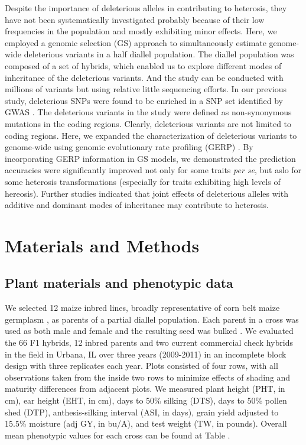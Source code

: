 \documentclass[9pt,twocolumn,twoside]{gsajnl}
\begin{document}
\DIFaddbegin 


\DIFaddend Despite the importance of deleterious alleles in contributing to heterosis, they have not been systematically investigated probably because of their low frequencies in the population and mostly exhibiting minor effects. Here, we employed a genomic selection (GS) approach to simultaneously estimate genome-wide deleterious variants in a half diallel population. The diallel population was composed of a set of hybrids, which enabled us to explore different modes of inheritance of the deleterious variants. And the study can be conducted with millions of variants but using relative little sequencing efforts. In our previous study, deleterious SNPs were found to be enriched in a SNP set identified by GWAS \citep{Mezmouk2014}. The deleterious variants in the study were defined as non-synonymous mutations in the coding regions. Clearly, deleterious variants are not limited to coding regions. Here, we expanded the characterization of deleterious variants to genome-wide using genomic evolutionary rate profiling (GERP) \citep{Cooper2005}. By incorporating GERP information in GS models, we demonstrated the prediction accuracies were significantly improved not only for some traits \emph{per se}, but aslo for some heterosis transformations (especially for traits exhibiting high levels of hereosis). Further studies indicated that joint effects of deleterious alleles with additive and dominant modes of inheritance may contribute to heterosis.


\section*{Materials and Methods} 

\subsection*{Plant materials and phenotypic data}
We selected 12 maize inbred lines, broadly representative of corn belt maize germplasm \citep{mikel2006evolution}, as parents of a partial diallel population. 
Each parent in a cross was used as both male and female and the resulting seed was bulked  \DIFaddbegin {}\DIFaddend . 
We evaluated the 66 F1 hybrids, 12 inbred parents and two current commercial check hybrids in the field in Urbana, IL over three years (2009-2011) in an incomplete block design with three replicates each year.  
Plots consisted of four rows, with all observations taken from the inside two rows to minimize effects of shading and maturity differences from adjacent plots.  
We measured plant height (PHT, in cm), ear height (EHT, in cm), days to 50\% silking (DTS), days to 50\% pollen shed (DTP), anthesis-silking interval (ASI, in days), grain yield adjusted to 15.5\% moisture (adj GY, in bu/A), and test weight (TW, in pounds). 
Overall mean phenotypic values for each cross can be found at Table \DIFdelbegin {}\DIFdel{)}\DIFdelend \DIFaddbegin \DIFadd{\ref{table:table_s1}}\DIFaddend .
\end{document}
